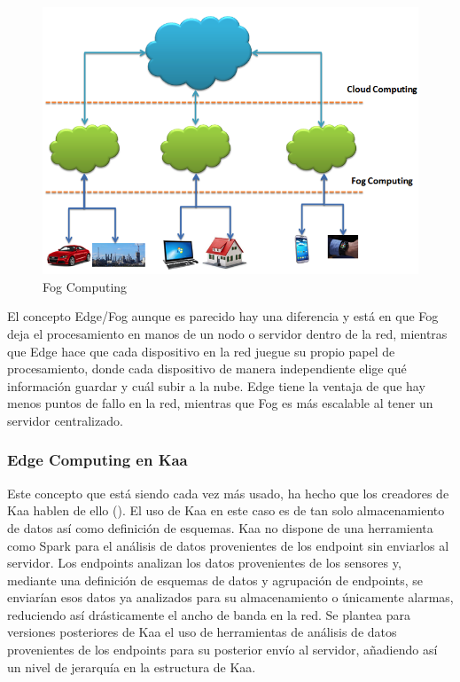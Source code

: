 \documentclass[12pt, twoside]{book}
\newcommand{\MYhref}[3][blue]{\href{#2}{\color{#1}{#3}}}
\begin{document}
\begin{figure}[H]
\centering
\includegraphics[scale=0.6]{images/fog_computing}
\caption{Fog Computing}\label{L509}
\end{figure}

El concepto Edge/Fog aunque es parecido hay una diferencia y está en que Fog deja el procesamiento en manos de un nodo o servidor dentro de la red, mientras que Edge hace que cada dispositivo en la red juegue su propio papel de procesamiento, donde cada dispositivo de manera independiente elige qué información guardar y cuál subir a la nube. Edge tiene la ventaja de que hay menos puntos de fallo en la red, mientras que Fog es más escalable al tener un servidor centralizado.

\subsubsection*{Edge Computing en Kaa}
Este concepto que está siendo cada vez más usado, ha hecho que los creadores de Kaa hablen de ello (\MYhref{https://www.kaaproject.org/edge-analytics-kaa/}{vídeo}). El uso de Kaa en este caso es de tan solo almacenamiento de datos así como definición de esquemas. Kaa no dispone de una herramienta como Spark para el análisis de datos provenientes de los endpoint sin enviarlos al servidor. Los endpoints analizan los datos provenientes de los sensores y, mediante una definición de esquemas de datos y agrupación de endpoints, se enviarían esos datos ya analizados para su almacenamiento o únicamente alarmas, reduciendo así drásticamente el ancho de banda en la red. 
Se plantea para versiones posteriores de Kaa el uso de herramientas de análisis de datos provenientes de los endpoints para su posterior envío al servidor, añadiendo así un nivel de jerarquía en la estructura de Kaa.
\end{document}
